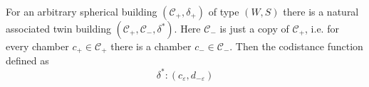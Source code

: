 \begin{exam}
	For an arbitrary spherical building $(\mathcal{C}_+, \delta_+)$ of type $(W,S)$ there is a natural associated twin building $(\mathcal{C}_+, \mathcal{C}_-, \delta^*)$. Here $\mathcal{C}_-$ is just a copy of $\mathcal{C}_+$, i.e. for every chamber $c_+ \in \mathcal{C}_+$ there is a chamber $c_- \in \mathcal{C}_-$. Then the codistance function defined as
	$$ \delta^* : (c_\varepsilon,d_{-\varepsilon}) $$
\end{exam}